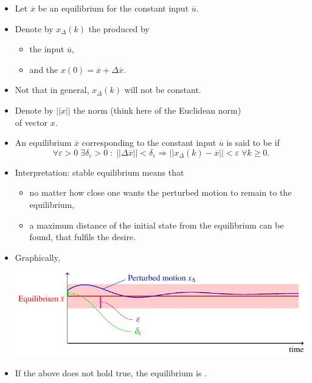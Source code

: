 \begin{frame}
\myPause
\begin{itemize}[<+-| alert@+>]
\item Let $\overline{x}$ be an equilibrium for the constant input $\overline{u}$.
\item Denote by $x_{\Delta}(k)$ the  produced by
      \begin{itemize}[<+-| alert@+>]
      \item the input $\overline{u}$,
      \item and the  $x(0)=\overline{x}+\Delta\overline{x}$.
      \end{itemize}
\item Not that in general, $x_{\Delta}(k)$ will not be constant.
\item Denote by $||x||$ the norm (think here of the Euclidean norm)\\
      of vector $x$.
\end{itemize}
\end{frame}


\begin{frame}
\myPause
\begin{itemize}[<+-| alert@+>]
\item An equilibrium $\overline{x}$ corresponding to the constant input $\overline{u}$ is said to be  if
      \begin{displaymath}
       \forall \varepsilon>0 \;
       \exists \delta_{\varepsilon}>0 \; : \;
       ||\Delta\overline{x}||<\delta_{\varepsilon}
       \Rightarrow ||x_{\Delta}(k)-\overline{x}||<\varepsilon \; \forall k \geq 0.
      \end{displaymath}
\item Interpretation: stable equilibrium means that
      \begin{itemize}[<+-| alert@+>]
      \item no matter how close one wants the  perturbed motion to remain to the equilibrium,
      \item a maximum distance of the initial state from the equilibrium can be\\
            found, that fulfils the desire.
      \end{itemize}
      \item Graphically,
            \begin{center}
             \includegraphics[width=0.60\columnwidth]{./Unit-02/img/StableEq-general.pdf}
            \end{center}
\item If the above does not hold true, the equilibrium is .
\end{itemize}
\end{frame}

